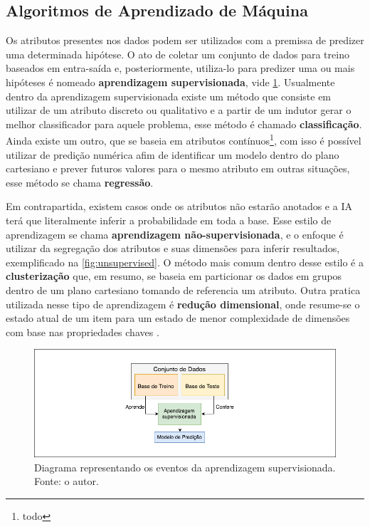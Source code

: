 \subsection{Algoritmos de Aprendizado de Máquina}
Os atributos presentes nos dados podem ser utilizados com a premissa de predizer uma determinada hipótese. O ato de coletar um conjunto de dados para treino baseados em entra-saída e, posteriormente, utiliza-lo para predizer uma ou mais hipóteses é nomeado \textbf{aprendizagem supervisionada}, vide \ref{fig:supervisedlearning}. Usualmente dentro da aprendizagem supervisionada existe um método que consiste em utilizar de um atributo discreto ou qualitativo e a partir de um indutor gerar o melhor classificador para aquele problema, esse método é chamado \textbf{classificação}. Ainda existe um outro, que se baseia em atributos contínuos\footnote{todo}, com isso é possível utilizar de predição numérica afim de identificar um modelo dentro do plano cartesiano e prever futuros valores para o mesmo atributo em outras situações, esse método se chama \textbf{regressão}. \cite{hastie2009unsupervised, russell2003artificial}

Em contrapartida, existem casos onde os atributos não estarão anotados e a IA terá que literalmente inferir a probabilidade em toda a base. Esse estilo de aprendizagem se chama \textbf{aprendizagem não-supervisionada}, e o enfoque é utilizar da segregação dos atributos e suas dimensões para inferir resultados, exemplificado na \ref{fig:unsupervised}. O método mais comum dentro desse estilo é a \textbf{clusterização} que, em resumo, se baseia em particionar os dados em grupos dentro de um plano cartesiano tomando de referencia um atributo. Outra pratica utilizada nesse tipo de aprendizagem é \textbf{redução dimensional}, onde resume-se o estado atual de um item para um estado de menor complexidade de dimensões com base nas propriedades chaves \cite{hastie2009unsupervised, mohri2012foundations}.

\begin{figure}
    \centering
    \includegraphics[width=.8\textwidth]{imagens/supervisedlearning.png}
    \caption{Diagrama representando os eventos da aprendizagem supervisionada. Fonte: o autor.}
    \label{fig:supervisedlearning}
\end{figure}

